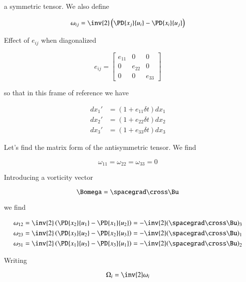 a symmetric tensor.  We also define

\begin{equation}\label{eqn:continuumL8:270}
\omega_{ij} = \inv{2} \left(
\PD{x_j}{u_i}
-\PD{x_i}{u_j} \right)
\end{equation}

Effect of $e_{ij}$ when diagonalized

\begin{equation}\label{eqn:continuumL8:290}
e_{ij}
=
\begin{bmatrix}
e_{11} & 0 & 0 \\
0 & e_{22} & 0 \\
0 & 0 & e_{33}
\end{bmatrix}
\end{equation}

so that in this frame of reference we have

\begin{align}\label{eqn:continuumL8:310}
dx_1' &= ( 1 + e_{11} \delta t) dx_1 \\
dx_2' &= ( 1 + e_{22} \delta t) dx_2 \\
dx_3' &= ( 1 + e_{33} \delta t) dx_3
\end{align}

Let's find the matrix form of the antisymmetric tensor.  We find

\begin{equation}\label{eqn:continuumL8:330}
\omega_{11} = \omega_{22} = \omega_{33} = 0
\end{equation}

Introducing a vorticity vector

\begin{equation}\label{eqn:continuumL8:350}
\Bomega = \spacegrad \cross \Bu
\end{equation}

we find

\begin{align}\label{eqn:continuumL8:370}
\omega_{12} &= \inv{2}\left( \PD{x_2}{u_1} -\PD{x_1}{u_2} \right) = - \inv{2} (\spacegrad \cross \Bu)_3 \\
\omega_{23} &= \inv{2}\left( \PD{x_3}{u_2} -\PD{x_2}{u_3} \right) = - \inv{2} (\spacegrad \cross \Bu)_1 \\
\omega_{31} &= \inv{2}\left( \PD{x_1}{u_3} -\PD{x_3}{u_1} \right) = - \inv{2} (\spacegrad \cross \Bu)_2
\end{align}

Writing

\begin{equation}\label{eqn:continuumL8:390}
\Omega_i = \inv{2} \omega_i
\end{equation}

